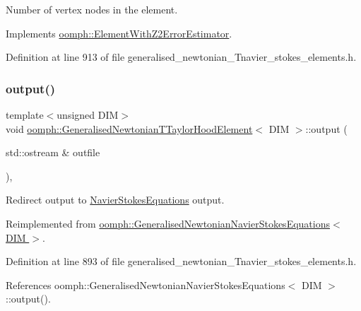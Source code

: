Number of vertex nodes in the element. 



Implements \hyperlink{classoomph_1_1ElementWithZ2ErrorEstimator_a19495a0e77ef4ff35f15fdf7913b4077}{oomph\+::\+Element\+With\+Z2\+Error\+Estimator}.



Definition at line 913 of file generalised\+\_\+newtonian\+\_\+\+Tnavier\+\_\+stokes\+\_\+elements.\+h.

\mbox{\label{classoomph_1_1GeneralisedNewtonianTTaylorHoodElement_a998c59443d1ac6472d036a5f0a839bed}} 
\subsubsection{\texorpdfstring{output()}{output()}\hspace{0.1cm}{\footnotesize\ttfamily [1/4]}}
{\footnotesize\ttfamily template$<$unsigned D\+IM$>$ \\
void \hyperlink{classoomph_1_1GeneralisedNewtonianTTaylorHoodElement}{oomph\+::\+Generalised\+Newtonian\+T\+Taylor\+Hood\+Element}$<$ D\+IM $>$\+::output (\begin{DoxyParamCaption}\item[{std\+::ostream \&}]{outfile }\end{DoxyParamCaption})\hspace{0.3cm}{\ttfamily [inline]}, {\ttfamily [virtual]}}



Redirect output to \hyperlink{classoomph_1_1NavierStokesEquations}{Navier\+Stokes\+Equations} output. 



Reimplemented from \hyperlink{classoomph_1_1GeneralisedNewtonianNavierStokesEquations_a1f84ecb8a91df11868349a1e826074bd}{oomph\+::\+Generalised\+Newtonian\+Navier\+Stokes\+Equations$<$ D\+I\+M $>$}.



Definition at line 893 of file generalised\+\_\+newtonian\+\_\+\+Tnavier\+\_\+stokes\+\_\+elements.\+h.



References oomph\+::\+Generalised\+Newtonian\+Navier\+Stokes\+Equations$<$ D\+I\+M $>$\+::output().

